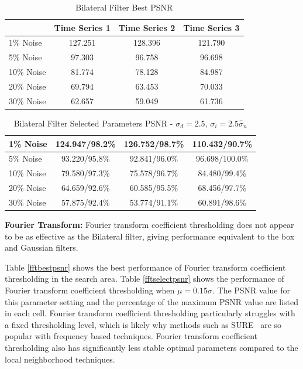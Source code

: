 \documentclass[11pt]{article}
\newcommand{\vs}{\vspace{0.1in}}
\theoremstyle{definition}
\begin{document}
\begin{table}[!h]
\small
\begin{center}
\begin{tabular}{l | c | c | c}
 & Time Series 1 & Time Series 2 & Time Series 3 \\ \hline
1\% Noise & 127.251 & 128.396 & 121.790 \\ \hline
5\% Noise & 97.303 & 96.758 & 96.698 \\ \hline
10\% Noise & 81.774 & 78.128 & 84.987 \\ \hline
20\% Noise & 69.794 & 63.453 & 70.033 \\ \hline
30\% Noise & 62.657 & 59.049 & 61.736
\end{tabular}
\caption{Bilateral Filter Best PSNR}
\label{bilateralbestpsnr}
\end{center}
\end{table}

\begin{table}[!h]
\small
\begin{center}
\begin{tabular}{l | c | c | c}
1\% Noise & 124.947/98.2\% & 126.752/98.7\% & 110.432/90.7\% \\ \hline
5\% Noise & 93.220/95.8\% & 92.841/96.0\% & 96.698/100.0\% \\ \hline
10\% Noise & 79.580/97.3\% & 75.578/96.7\% & 84.480/99.4\% \\ \hline
20\% Noise & 64.659/92.6\% & 60.585/95.5\% & 68.456/97.7\% \\ \hline
30\% Noise & 57.875/92.4\% & 53.774/91.1\% & 60.891/98.6\%
\end{tabular}
\caption{Bilateral Filter Selected Parameters PSNR - $\sigma_d = 2.5$, $\sigma_i = 2.5 \hat{\sigma}_n$}
\label{bilateralselectpsnr}
\end{center}
\end{table}

\vs
\noindent
\textbf{Fourier Transform:} Fourier transform coefficient thresholding does not appear to be as effective as the Bilateral filter, giving performance equivalent to the box and Gaussian filters.

Table \ref{fftbestpsnr} shows the best performance of Fourier transform coefficient thresholding in the search area. Table \ref{fftselectpsnr} shows the performance of Fourier transform coefficient thresholding when $\mu = 0.15 \sigma$. The PSNR value for this parameter setting and the percentage of the maximum PSNR value are listed in each cell. Fourier transform coefficient thresholding particularly struggles with a fixed thresholding level, which is likely why methods such as SURE~\cite{Rangarajan02} are so popular with frequency based techniques. Fourier transform coefficient thresholding also has significantly less stable optimal parameters compared to the local neighborhood techniques.
\end{document}
